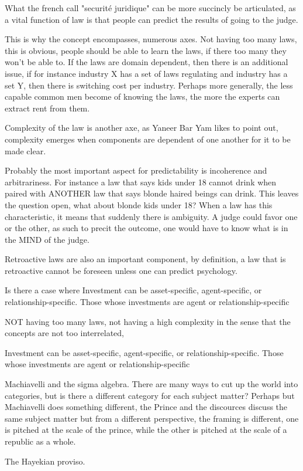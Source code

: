 \documentclass[12pt]{report}
\numberwithin{equation}{section}
\begin{document}
What the french call "securité juridique" can be more succincly be articulated, as a vital function of law is that people can predict the results of going to the judge. 

This is why the concept encompasses, numerous axes. Not having too many laws, this is obvious, people should be able to learn the laws, if there too many they won't be able to. If the laws are domain dependent, then there is an additional issue, if for instance industry X has a set of laws regulating and industry has a set Y, then there is switching cost per industry. Perhaps more generally, the less capable common men become of knowing the laws, the more the experts can extract rent from them. 

Complexity of the law is another axe, as Yaneer Bar Yam likes to point out, complexity emerges when components are dependent of one another for it to be made clear. 

Probably the most important aspect for predictability is incoherence and arbitrariness. For instance a law that says kids under 18 cannot drink when paired with ANOTHER law that says blonde haired beings can drink. This leaves the question open, what about blonde kids under 18? When a law has this characteristic, it means that suddenly there is ambiguity. A judge could favor one or the other, as such to precit the outcome, one would have to know what is in the MIND of the judge. 

Retroactive laws are also an important component, by definition, a law that is retroactive cannot be foreseen unless one can predict psychology. 

Is there a case where Investment can be asset-specific, agent-specific, or relationship-specific. 
Those whose investments are agent or relationship-specific 


 NOT having too many laws, not having a high complexity in the sense that the concepts are not too interrelated,  



Investment can be asset-specific, agent-specific, or relationship-specific. 
Those whose investments are agent or relationship-specific 


Machiavelli and the sigma algebra. There are many ways to cut up the world into categories, but is there a different category for each subject matter? Perhaps but Machiavelli does something different, the Prince and the discources discuss the same subject matter but from a different perspective, the framing is different, one is pitched at the scale of the prince, while the other is pitched at the scale of a republic as a whole. 

The Hayekian proviso. 




\end{document}
